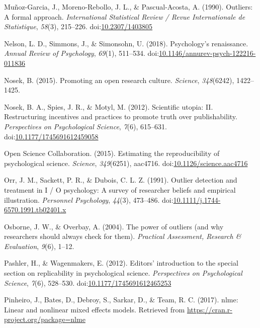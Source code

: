 \documentclass[english,,man,mask]{apa6}
\theoremstyle{definition}
\theoremstyle{definition}
\theoremstyle{definition}
\theoremstyle{remark}
\begin{document}
\hypertarget{ref-Munoz-Garcia1990}{}
Muñoz-Garcia, J., Moreno-Rebollo, J. L., \& Pascual-Acosta, A. (1990).
Outliers: A formal approach. \emph{International Statistical Review /
Revue Internationale de Statistique}, \emph{58}(3), 215--226.
doi:\href{https://doi.org/10.2307/1403805}{10.2307/1403805}

\hypertarget{ref-Nelson2018}{}
Nelson, L. D., Simmons, J., \& Simonsohn, U. (2018). Psychology's
renaissance. \emph{Annual Review of Psychology}, \emph{69}(1), 511--534.
doi:\href{https://doi.org/10.1146/annurev-psych-122216-011836}{10.1146/annurev-psych-122216-011836}

\hypertarget{ref-Nosek2015b}{}
Nosek, B. (2015). Promoting an open research culture. \emph{Science},
\emph{348}(6242), 1422--1425.

\hypertarget{ref-Nosek2012c}{}
Nosek, B. A., Spies, J. R., \& Motyl, M. (2012). Scientific utopia: II.
Restructuring incentives and practices to promote truth over
publishability. \emph{Perspectives on Psychological Science},
\emph{7}(6), 615--631.
doi:\href{https://doi.org/10.1177/1745691612459058}{10.1177/1745691612459058}

\hypertarget{ref-ScienceCollaboration2015}{}
Open Science Collaboration. (2015). Estimating the reproducibility of
psychological science. \emph{Science}, \emph{349}(6251), aac4716.
doi:\href{https://doi.org/10.1126/science.aac4716}{10.1126/science.aac4716}

\hypertarget{ref-Orr1991}{}
Orr, J. M., Sackett, P. R., \& Dubois, C. L. Z. (1991). Outlier
detection and treatment in I / O psychology: A survey of researcher
beliefs and empirical illustration. \emph{Personnel Psychology},
\emph{44}(3), 473--486.
doi:\href{https://doi.org/10.1111/j.1744-6570.1991.tb02401.x}{10.1111/j.1744-6570.1991.tb02401.x}

\hypertarget{ref-Osborne2004}{}
Osborne, J. W., \& Overbay, A. (2004). The power of outliers (and why
researchers should always check for them). \emph{Practical Assessment,
Research \& Evaluation}, \emph{9}(6), 1--12.

\hypertarget{ref-Pashler2012a}{}
Pashler, H., \& Wagenmakers, E. (2012). Editors' introduction to the
special section on replicability in psychological science.
\emph{Perspectives on Psychological Science}, \emph{7}(6), 528--530.
doi:\href{https://doi.org/10.1177/1745691612465253}{10.1177/1745691612465253}

\hypertarget{ref-Pinheiro2017}{}
Pinheiro, J., Bates, D., Debroy, S., Sarkar, D., \& Team, R. C. (2017).
nlme: Linear and nonlinear mixed effects models. Retrieved from
\url{https://cran.r-project.org/package=nlme}
\end{document}
